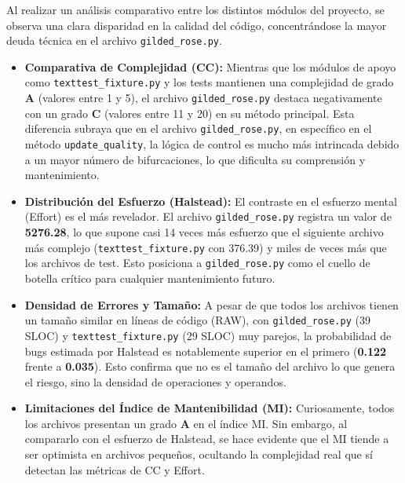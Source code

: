 \documentclass{article}
\newcommand{\good}[1]{\textbf{\textcolor{metGood}{#1}}}
\newcommand{\medium}[1]{\textbf{\textcolor{metMedium}{#1}}}
\newcommand{\bad}[1]{\textbf{\textcolor{metBad}{#1}}}
\begin{document}
Al realizar un análisis comparativo entre los distintos módulos del proyecto, se observa
una clara disparidad en la calidad del código, concentrándose la mayor deuda técnica en el
archivo \texttt{gilded\_rose.py}.

\begin{itemize}
    \item \textbf{Comparativa de Complejidad (CC):} Mientras que los módulos de apoyo
          como \texttt{texttest\_fixture.py} y los tests mantienen una complejidad de grado
          \good{A} (valores entre 1 y 5), el archivo \texttt{gilded\_rose.py} destaca
          negativamente con un grado \medium{C} (valores entre 11 y 20) en su método
          principal. Esta diferencia subraya que en el archivo \texttt{gilded\_rose.py},
          en específico en el método \texttt{update\_quality}, la lógica de control es
          mucho más intrincada debido a un mayor número de bifurcaciones, lo que
          dificulta su comprensión y mantenimiento.

    \item \textbf{Distribución del Esfuerzo (Halstead):} El contraste en el esfuerzo mental
          (Effort) es el más revelador. El archivo \texttt{gilded\_rose.py} registra un valor de
          \bad{5276.28}, lo que supone casi 14 veces más esfuerzo que el siguiente archivo más complejo
          (\texttt{texttest\_fixture.py} con 376.39) y miles de veces más que los archivos de test.
          Esto posiciona a \texttt{gilded\_rose.py} como el cuello de botella crítico para cualquier
          mantenimiento futuro.

    \item \textbf{Densidad de Errores y Tamaño:} A pesar de que todos los archivos tienen un tamaño
          similar en líneas de código (RAW), con \texttt{gilded\_rose.py} (39 SLOC) y
          \texttt{texttest\_fixture.py} (29 SLOC) muy parejos, la probabilidad de bugs estimada por
          Halstead es notablemente superior en el primero (\medium{0.122} frente a \good{0.035}). Esto
          confirma que no es el tamaño del archivo lo que genera el riesgo, sino la densidad de
          operaciones y operandos.

    \item \textbf{Limitaciones del Índice de Mantenibilidad (MI):} Curiosamente, todos
          los archivos presentan un grado \good{A} en el índice MI. Sin embargo, al compararlo
          con el esfuerzo de Halstead, se hace evidente que el MI tiende a ser optimista en
          archivos pequeños, ocultando la complejidad real que sí detectan las métricas de CC y Effort.
\end{itemize}
\end{document}
